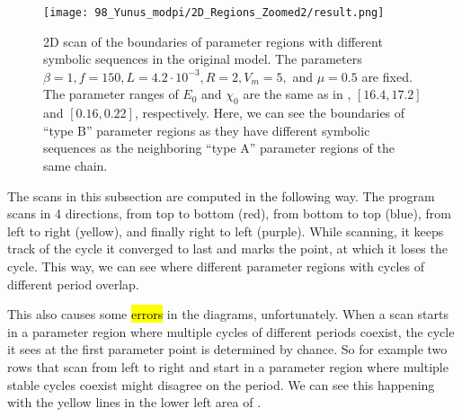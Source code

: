 \begin{figure}
	\centering
	\texttt{[image: 98\_Yunus\_modpi/2D\_Regions\_Zoomed2/result.png]}
	\caption[2D scan of the boundaries of parameter regions with different symbolic sequences in the original model]{
		2D scan of the boundaries of parameter regions with different symbolic sequences in the original model.
		The parameters $\beta = 1, f = 150, L = 4.2 \cdot 10^{-3}, R = 2, V_m = 5,$ and $\mu = 0.5$ are fixed.
		The parameter ranges of $E_0$ and $\chi_0$ are the same as in , $[16.4, 17.2]$ and $[0.16, 0.22]$, respectively.
		Here, we can see the boundaries of ``type B'' parameter regions as they have different symbolic sequences as the neighboring ``type A'' parameter regions of the same chain.\footnotemark[1]
	}
	\label{fig:etup.og.overlapping.regions.zoomed}
\end{figure}

The scans in this subsection are computed in the following way.
The program scans in 4 directions, from top to bottom (red), from bottom to top (blue), from left to right (yellow), and finally right to left (purple).
While scanning, it keeps track of the cycle it converged to last and marks the point, at which it loses the cycle.
This way, we can see where different parameter regions with cycles of different period overlap.

This also causes some \hl{errors} in the diagrams, unfortunately.
When a scan starts in a parameter region where multiple cycles of different periods coexist, the cycle it sees at the first parameter point is determined by chance.
So for example two rows that scan from left to right and start in a parameter region where multiple stable cycles coexist might disagree on the period.
We can see this happening with the yellow lines in the lower left area of .

